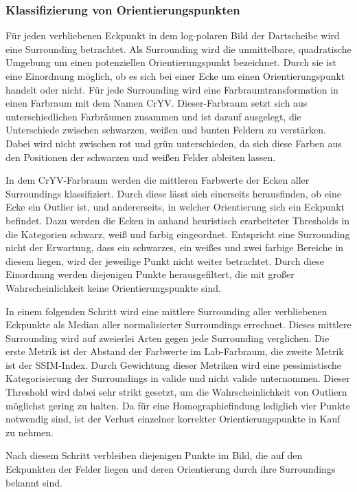 \subsubsection{Klassifizierung von Orientierungspunkten}
\label{sec:orientierungspunkte_klassifizieren}

Für jeden verbliebenen Eckpunkt in dem log-polaren Bild der Dartscheibe wird eine Surrounding betrachtet. Als Surrounding wird die unmittelbare, quadratische Umgebung um einen potenziellen Orientierungspunkt bezeichnet. Durch sie ist eine Einordnung möglich, ob es sich bei einer Ecke um einen Orientierungspunkt handelt oder nicht. Für jede Surrounding wird eine Farbraumtransformation in einen Farbraum mit dem Namen CrYV. Dieser-Farbraum setzt sich aus unterschiedlichen Farbräumen zusammen und ist darauf ausgelegt, die Unterschiede zwischen schwarzen, weißen und bunten Feldern zu verstärken. Dabei wird nicht zwischen rot und grün unterschieden, da sich diese Farben aus den Positionen der schwarzen und weißen Felder ableiten lassen.

In dem CrYV-Farbraum werden die mittleren Farbwerte der Ecken aller Surroundings klassifiziert. Durch diese lässt sich einerseits herausfinden, ob eine Ecke ein Outlier ist, und andererseits, in welcher Orientierung sich ein Eckpunkt befindet. Dazu werden die Ecken in anhand heuristisch erarbeiteter Thresholds in die Kategorien schwarz, weiß und farbig eingeordnet. Entspricht eine Surrounding nicht der Erwartung, dass ein schwarzes, ein weißes und zwei farbige Bereiche in diesem liegen, wird der jeweilige Punkt nicht weiter betrachtet. Durch diese Einordnung werden diejenigen Punkte herausgefiltert, die mit großer Wahrscheinlichkeit keine Orientierungspunkte sind.

In einem folgenden Schritt wird eine mittlere Surrounding aller verbliebenen Eckpunkte als Median aller normalisierter Surroundings errechnet. Dieses mittlere Surrounding wird auf zweierlei Arten gegen jede Surrounding verglichen. Die erste Metrik ist der Abstand der Farbwerte im Lab-Farbraum, die zweite Metrik ist der SSIM-Index. Durch Gewichtung dieser Metriken wird eine pessimistische Kategorisierung der Surroundings in valide und nicht valide unternommen. Dieser Threshold wird dabei sehr strikt gesetzt, um die Wahrscheinlichkeit von Outliern möglichst gering zu halten. Da für eine Homographiefindung lediglich vier Punkte notwendig sind, ist der Verlust einzelner korrekter Orientierungspunkte in Kauf zu nehmen.

Nach diesem Schritt verbleiben diejenigen Punkte im Bild, die auf den Eckpunkten der Felder liegen und deren Orientierung durch ihre Surroundings bekannt sind.

